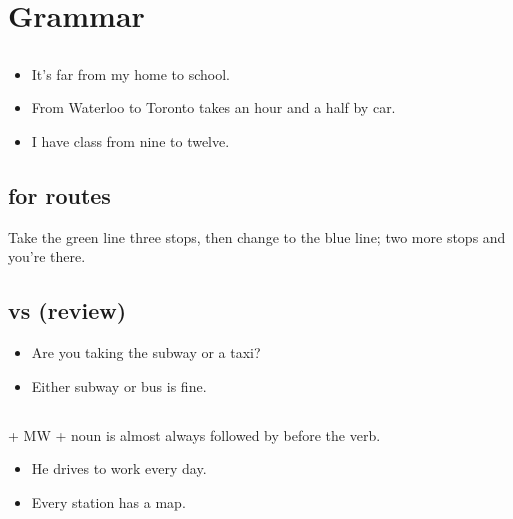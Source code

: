 \section{Grammar}

\subsection{}

\begin{itemize}
  \item {} It's far from my home to school.
  \item {} From Waterloo to Toronto takes an
        hour and a half by car.
  \item {} I have class from nine to twelve.
\end{itemize}

\subsection{ for routes}

 Take the green line three stops,
then change to the blue line; two more stops and you're there.

\subsection{ vs  (review)}

\begin{itemize}
  \item {} Are you taking the subway or a taxi?
  \item {} Either subway or bus is fine.
\end{itemize}

\subsection{}

 + MW + noun is almost always followed by  before the verb.
\begin{itemize}
  \item {} He drives to work every day.
  \item {} Every station has a map.
\end{itemize}

